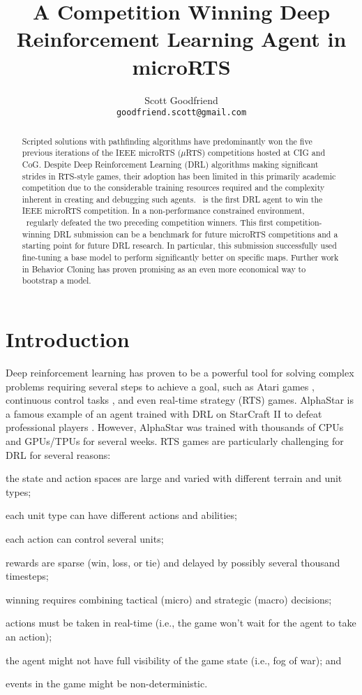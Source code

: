 \documentclass{article}
\title{A Competition Winning Deep Reinforcement Learning Agent in microRTS}
\author{Scott Goodfriend \\
\texttt{goodfriend.scott@gmail.com} \\
}
\begin{document}
\maketitle
\begin{abstract}
    Scripted solutions with pathfinding algorithms have predominantly won the five
    previous iterations of the IEEE microRTS ($\mu$RTS) competitions hosted at CIG and
    CoG. Despite Deep Reinforcement Learning (DRL) algorithms making significant strides
    in RTS-style games, their adoption has been limited in this primarily academic
    competition due to the considerable training resources required and the complexity
    inherent in creating and debugging such agents. \agentName\ is the first DRL agent
    to win the IEEE microRTS competition. In a
    non-performance constrained environment, \agentName\ regularly defeated the two
    preceding competition winners. This first competition-winning DRL submission can be
    a benchmark for future microRTS competitions and a starting point for future DRL
    research. In particular, this submission successfully used fine-tuning a base model
    to perform significantly better on specific maps. Further work in Behavior Cloning
    has proven promising as an even more economical way to bootstrap a model.
\end{abstract}
\section{Introduction}
Deep reinforcement learning has proven to be a powerful tool for solving complex
problems requiring several steps to achieve a goal, such as Atari games \citep{DBLP:journals/corr/MnihKSGAWR13}, continuous
control tasks \citep{DBLP:journals/corr/LillicrapHPHETS15}, and even real-time strategy
(RTS) games. AlphaStar is a famous example of an agent trained with DRL on StarCraft
II to defeat professional players \citep{Vinyals2019GrandmasterLI}. However, AlphaStar was trained with thousands of
CPUs and GPUs/TPUs for several weeks. RTS games are particularly challenging for DRL for
several reasons:
\begin{inparaenum}[(1)]
    \item the state and action spaces are large and varied with different terrain and
        unit types;
    \item each unit type can have different actions and abilities;
    \item each action can control several units;
    \item rewards are sparse (win, loss, or tie) and delayed by possibly several
    thousand timesteps;
    \item winning requires combining tactical (micro) and strategic (macro) decisions;
    \item actions must be taken in real-time (i.e., the game won't wait for the agent to
        take an action);
    \item the agent might not have full visibility of the game state (i.e., fog of war); and
    \item events in the game might be non-deterministic.
\end{inparaenum}
\end{document}
